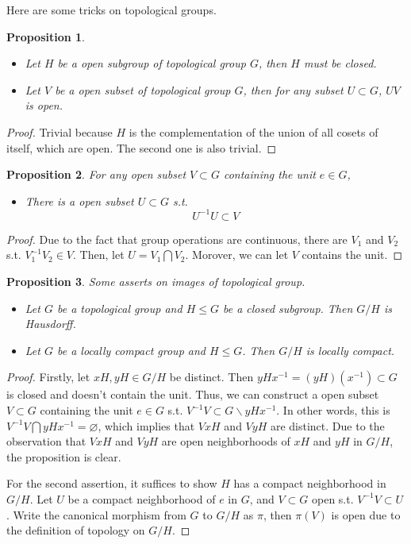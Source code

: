 \documentclass[12pt,a4paper]{article}
\newtheorem{prop}{Proposition}
\begin{document}
Here are some tricks on topological groups.%
\begin{prop}
    \begin{itemize}
        \item Let $H$ be a open subgroup of topological group $G$, then $H$ must be closed.
        \item Let $V$ be a open subset of topological group $G$, then for any subset $U\subset G$, $UV$ is open.
    \end{itemize}
\end{prop}
\begin{proof}
    Trivial because $H$ is the complementation of the union of all cosets of itself, which are open. The second one is also trivial.
\end{proof}
\begin{prop}
    For any open subset $V\subset G$ containing the unit $e\in G$, 
    \begin{itemize}
        \item There is a open subset $U\subset G$ s.t. \[U^{-1}U\subset V\]
    \end{itemize}
\end{prop}
\begin{proof}
    Due to the fact that group operations are continuous, there are $V_1$ and $V_2$ s.t. $V_1^{-1}V_2\in V$. Then, let $U=V_1\bigcap V_2$. Morover, we can let $V$ contains the unit.
\end{proof}
\begin{prop}
    Some asserts on images of topological group.
    \begin{itemize}
        \item Let $G$ be a topological group and $H\leq G$ be a closed subgroup. Then $G/H$ is Hausdorff.
        \item Let $G$ be a locally compact group and $H\leq G$. Then $G/H$ is locally compact.
    \end{itemize}
\end{prop}
\begin{proof}
    Firstly, let $xH, yH\in G/H$ be distinct. Then $yHx^{-1}=(yH)(x^{-1})\subset G$ is closed and doesn't contain the unit. Thus, we can construct a open subset $V\subset G$ containing the unit $e\in G$ s.t. $V^{-1}V\subset G\backslash yHx^{-1}$. In other words, this is $V^{-1}V\bigcap yHx^{-1}=\varnothing$, which implies that $VxH$ and $VyH$ are distinct. Due to the observation that $VxH$ and $VyH$ are open neighborhoods of $xH$ and $yH$ in $G/H$, the proposition is clear.
    \par For the second assertion, it suffices to show $H$ has a compact neighborhood in $G/H$. Let $U$ be a compact neighborhood of $e$ in $G$, and $V\subset G$ open s.t. $V^{-1}V\subset U$. Write the canonical morphism from $G$ to $G/H$ as $\pi$, then $\pi(V)$ is open due to the definition of topology on $G/H$. 
\end{proof}
\end{document}
